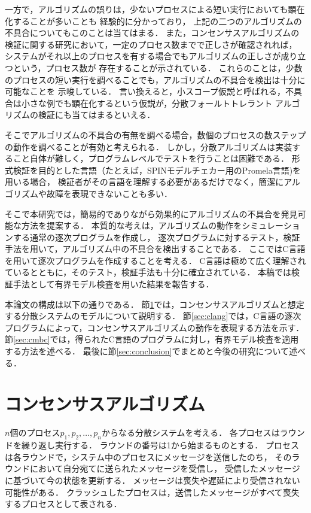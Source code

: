 \documentclass[technicalreport]{ieicej}
\theoremstyle{plain}
\begin{document}
一方で，アルゴリズムの誤りは，少ないプロセスによる短い実行においても顕在化することが多いことも
経験的に分かっており，
上記の二つのアルゴリズムの不具合についてもこのことは当てはまる．
また，コンセンサスアルゴリズムの検証に関する研究において，一定のプロセス数までで正しさが確認されれば，
システムがそれ以上のプロセスを有する場合でもアルゴリズムの正しさが成り立つという，プロセス数が
存在することが示されている\cite{MaricSB17}．
これらのことは，少数のプロセスの短い実行を調べることでも，アルゴリズムの不具合を検出は十分に可能なことを
示唆している．
言い換えると，小スコープ仮説と呼ばれる，不具合は小さな例でも顕在化するという仮説が，分散フォールトトレラント
アルゴリズムの検証にも当てはまるといえる．

そこでアルゴリズムの不具合の有無を調べる場合，数個のプロセスの数ステップの動作を調べることが有効と考えられる．
しかし，分散アルゴリズムは実装すること自体が難しく，プログラムレベルでテストを行うことは困難である．
形式検証を目的とした言語（たとえば，SPINモデルチェカー用のPromela言語\cite{spinbook})を用いる場合，
検証者がその言語を理解する必要があるだけでなく，簡潔にアルゴリズムや故障を表現できないことも多い．

そこで本研究では，簡易的でありながら効果的にアルゴリズムの不具合を発見可能な方法を提案する．
本質的な考えは，アルゴリズムの動作をシミュレーションする通常の逐次プログラムを作成し，
逐次プログラムに対するテスト，検証手法を用いて，アルゴリズム中の不具合を検出することである．
ここではC言語を用いて逐次プログラムを作成することを考える．
C言語は極めて広く理解されているとともに，そのテスト，検証手法も十分に確立されている．
本稿では検証手法として有界モデル検査を用いた結果を報告する．

本論文の構成は以下の通りである．
節\ref{sec:consensus}では，コンセンサスアルゴリズムと想定する分散システムのモデルについて説明する．
節\ref{sec:clang}では，C言語の逐次プログラムによって，コンセンサスアルゴリズムの動作を表現する方法を示す．
節\ref{sec:cmbc}では，得られたC言語のプログラムに対し，有界モデル検査を適用する方法を述べる．
最後に節\ref{sec:conclusion}でまとめと今後の研究について述べる．

\section{コンセンサスアルゴリズム}\label{sec:consensus}

$n$個のプロセス$p_1, p_2, \ldots, p_n$からなる分散システムを考える．
各プロセスはラウンドを繰り返し実行する．
ラウンドの番号は1から始まるものとする．
プロセスは各ラウンドで，システム中のプロセスにメッセージを送信したのち，
そのラウンドにおいて自分宛てに送られたメッセージを受信し，
受信したメッセージに基づいて今の状態を更新する．
メッセージは喪失や遅延により受信されない可能性がある．
クラッシュしたプロセスは，送信したメッセージがすべて喪失するプロセスとして表される．
\end{document}
